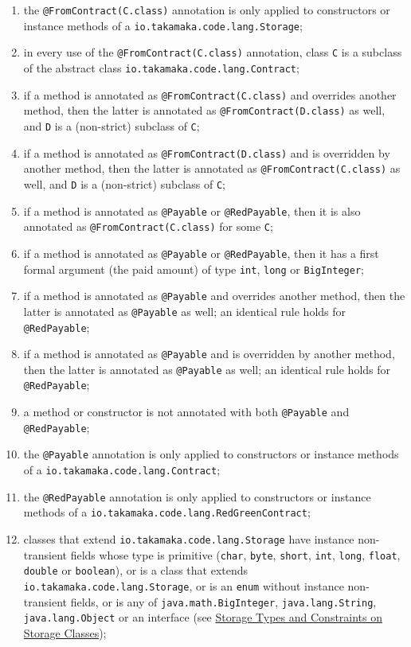 \documentclass[a4paper,]{book}
\providecommand{\tightlist}{%
  \setlength{\itemsep}{0pt}\setlength{\parskip}{0pt}}
\begin{document}
{\begin{enumerate}
\def\labelenumi{\arabic{enumi}.}
\tightlist
\item
  the \texttt{@FromContract(C.class)} annotation is only applied to
  constructors or instance methods of a
  \texttt{io.takamaka.code.lang.Storage};
\item
  in every use of the \texttt{@FromContract(C.class)} annotation, class
  \texttt{C} is a subclass of the abstract class
  \texttt{io.takamaka.code.lang.Contract};
\item
  if a method is annotated as \texttt{@FromContract(C.class)} and
  overrides another method, then the latter is annotated as
  \texttt{@FromContract(D.class)} as well, and \texttt{D} is a
  (non-strict) subclass of \texttt{C};
\item
  if a method is annotated as \texttt{@FromContract(D.class)} and is
  overridden by another method, then the latter is annotated as
  \texttt{@FromContract(C.class)} as well, and \texttt{D} is a
  (non-strict) subclass of \texttt{C};
\item
  if a method is annotated as \texttt{@Payable} or \texttt{@RedPayable},
  then it is also annotated as \texttt{@FromContract(C.class)} for some
  \texttt{C};
\item
  if a method is annotated as \texttt{@Payable} or \texttt{@RedPayable},
  then it has a first formal argument (the paid amount) of type
  \texttt{int}, \texttt{long} or \texttt{BigInteger};
\item
  if a method is annotated as \texttt{@Payable} and overrides another
  method, then the latter is annotated as \texttt{@Payable} as well; an
  identical rule holds for \texttt{@RedPayable};
\item
  if a method is annotated as \texttt{@Payable} and is overridden by
  another method, then the latter is annotated as \texttt{@Payable} as
  well; an identical rule holds for \texttt{@RedPayable};
\item
  a method or constructor is not annotated with both \texttt{@Payable}
  and \texttt{@RedPayable};
\item
  the \texttt{@Payable} annotation is only applied to constructors or
  instance methods of a \texttt{io.takamaka.code.lang.Contract};
\item
  the \texttt{@RedPayable} annotation is only applied to constructors or
  instance methods of a \texttt{io.takamaka.code.lang.RedGreenContract};
\item
  classes that extend \texttt{io.takamaka.code.lang.Storage} have
  instance non-transient fields whose type is primitive (\texttt{char},
  \texttt{byte}, \texttt{short}, \texttt{int}, \texttt{long},
  \texttt{float}, \texttt{double} or \texttt{boolean}), or is a class
  that extends \texttt{io.takamaka.code.lang.Storage}, or is an
  \texttt{enum} without instance non-transient fields, or is any of
  \texttt{java.math.BigInteger}, \texttt{java.lang.String},
  \texttt{java.lang.Object} or an interface (see
  \protect\hyperlink{storage-types}{Storage Types and Constraints on
  Storage Classes});
\end{enumerate}

}
\end{document}
